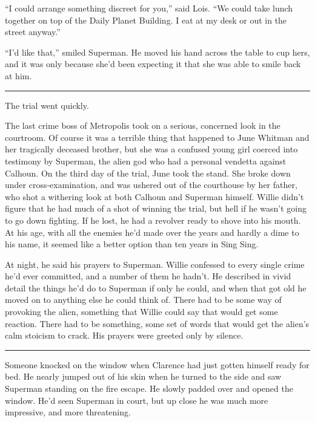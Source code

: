 ``I could arrange something discreet for you,'' said Lois. ``We could
take lunch together on top of the Daily Planet Building. I eat at my
desk or out in the street anyway.''

``I'd like that,'' smiled Superman. He moved his hand across the table
to cup hers, and it was only because she'd been expecting it that she
was able to smile back at him.

\begin{center}\rule{0.5\linewidth}{\linethickness}\end{center}

The trial went quickly.

The last crime boss of Metropolis took on a serious, concerned look in
the courtroom. Of course it was a terrible thing that happened to June
Whitman and her tragically deceased brother, but she was a confused
young girl coerced into testimony by Superman, the alien god who had a
personal vendetta against Calhoun. On the third day of the trial, June
took the stand. She broke down under cross‐examination, and was ushered
out of the courthouse by her father, who shot a withering look at both
Calhoun and Superman himself. Willie didn't figure that he had much of a
shot of winning the trial, but hell if he wasn't going to go down
fighting. If he lost, he had a revolver ready to shove into his mouth.
At his age, with all the enemies he'd made over the years and hardly a
dime to his name, it seemed like a better option than ten years in Sing
Sing.

At night, he said his prayers to Superman. Willie confessed to every
single crime he'd ever committed, and a number of them he hadn't. He
described in vivid detail the things he'd do to Superman if only he
could, and when that got old he moved on to anything else he could think
of. There had to be some way of provoking the alien, something that
Willie could say that would get some reaction. There had to be
something, some set of words that would get the alien's calm stoicism to
crack. His prayers were greeted only by silence.

\begin{center}\rule{0.5\linewidth}{\linethickness}\end{center}

Someone knocked on the window when Clarence had just gotten himself
ready for bed. He nearly jumped out of his skin when he turned to the
side and saw Superman standing on the fire escape. He slowly padded over
and opened the window. He'd seen Superman in court, but up close he was
much more impressive, and more threatening.


